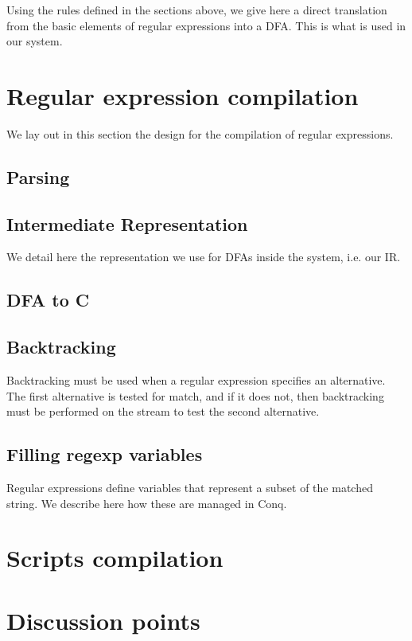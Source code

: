 \documentclass[11pt,a4paper]{article}
\begin{document}
Using the rules defined in the sections above, we give here a direct translation from the basic elements of regular expressions into a DFA. This is what is used in our system.


\section{Regular expression compilation}

We lay out in this section the design for the compilation of regular expressions.

\subsection{Parsing}

\subsection{Intermediate Representation}

We detail here the representation we use for DFAs inside the system, i.e. our IR.

\subsection{DFA to C}

\subsection{Backtracking}

Backtracking must be used when a regular expression specifies an alternative. The first alternative is tested for match, and if it does not, then backtracking must be performed on the stream to test the second alternative.

\subsection{Filling regexp variables}

Regular expressions define variables that represent a subset of the matched string. We describe here how these are managed in Conq.

\section{Scripts compilation}

\section{Discussion points}
\end{document}
